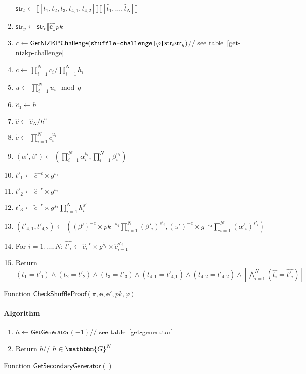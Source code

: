 \documentclass[a4paper]{article}
\newcommand{\G}{\mathbbm{G}}
\begin{document}
\begin{table}
\begin{framed}
\begin{enumerate}
      $\textsf{str}_t\leftarrow\llbracket[t_1,t_2,t_3,t_{4,1},t_{4,2}]\rrbracket\llbracket[\hat{t}_1,\dots,\hat{t}_N]\rrbracket$
    \item
      $\textsf{str}_y\leftarrow\textsf{str}_c\llbracket\hat{\textbf{c}}\rrbracket
      pk$\hfill
    \item
      $c\leftarrow\textsf{GetNIZKPChallenge}(\verb=shuffle-challenge|=\varphi\verb=|=\textsf{str}_t\textsf{str}_y)$\hfill//
      see table~\ref{get-nizkp-challenge}
    \item $\bar{c}\leftarrow\prod_{i=1}^N c_i/\prod_{i=1}^N h_i$
    \item $u\leftarrow\prod_{i=1}^N u_i\mod q$
    \item $\hat{c}_0\leftarrow h$
    \item $\hat{c}\leftarrow\hat{c}_N/h^u$
    \item $\tilde{c}\leftarrow\prod_{i=1}^N c_i^{u_i}$
    \item $(\alpha',\beta')\leftarrow(\prod_{i=1}^N \alpha_i^{u_i},\prod_{i=1}^N \beta_i^{u_i})$
    \item $t'_1\leftarrow\bar{c}^{-c}\times g^{s_1}$
    \item $t'_2\leftarrow\hat{c}^{-c}\times g^{s_2}$
    \item $t'_3\leftarrow\tilde{c}^{-c}\times g^{s_3}\prod_{i=1}^N h_i^{s'_i}$
    \item
      $(t'_{4,1},t'_{4,2})\leftarrow((\beta')^{-c}\times
      pk^{-s_4}\prod_{i=1}^N(\beta'_i)^{s'_i},(\alpha')^{-c}\times
      g^{-s_4}\prod_{i=1}^N(\alpha'_i)^{s'_i})$
    \item For $i=1,\dots,N$: $\hat{t'_i}\leftarrow\hat{c}_i^{-c}\times g^{\hat{s}_i}\times\hat{c}_{i-1}^{s'_i}$
    \item Return
      $(t_1=t'_1)\land(t_2=t'_2)\land(t_3=t'_3)\land(t_{4,1}=t'_{4,1})\land(t_{4,2}=t'_{4,2})\land\left[\bigwedge_{i=1}^N(\hat{t_i}=\hat{t'_i})\right]$
    \end{enumerate}
  \end{framed}
  \caption{Function $\mathsf{CheckShuffleProof}(\pi,\textbf{e},\textbf{e}',pk,\varphi)$}
  \label{check-shuffle-proof}
\end{table}

\begin{table}
  \begin{framed}
    \noindent\paragraph{Algorithm}
    \begin{enumerate}
    \item $h\leftarrow\textsf{GetGenerator}(-1)$\hfill// see
      table~\ref{get-generator}
    \item Return $h$\hfill// $h\in\G^N$
    \end{enumerate}
  \end{framed}
  \caption{Function $\mathsf{GetSecondaryGenerator}()$}
  \label{get-secondary-generator}
\end{table}
\end{document}

